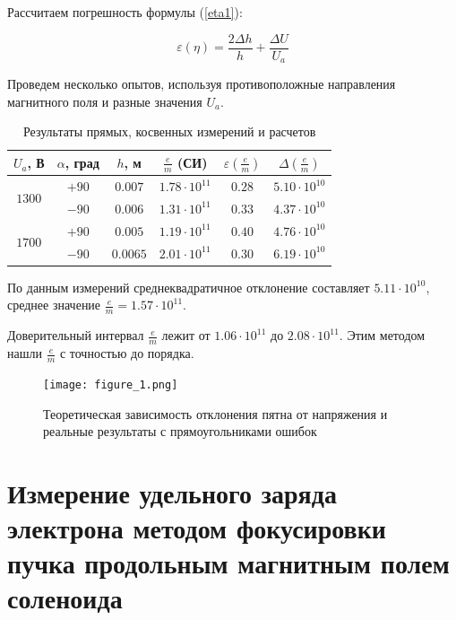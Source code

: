 Рассчитаем погрешность формулы (\ref{eta1}):

\begin{equation}
	\varepsilon{(\eta)}=\frac{2\Delta{h}}{h}+\frac{\Delta{U}}{U_a}
\end{equation}

Проведем несколько опытов, используя противоположные направления магнитного поля и разные значения $U_a$.

\begin{table}[h]
\begin{center}
\begin{tabular}{|c|c|c|c|c|c|}

\hline
$U_a$, В & $\alpha$, град & $h$, м & $\frac{e}{m}$ (СИ) & $\varepsilon{(\frac{e}{m})}$ & $\Delta{(\frac{e}{m})}$\\
\hline
\multirow{2}{*}{$1300$} & $+90$ & $0.007$ & $1.78\cdot10^{11}$ & $0.28$ & $5.10\cdot10^{10}$ \\ 

\cline{2-6}
						& $-90$ & $0.006$ & $1.31\cdot10^{11}$ & $0.33$ & $4.37\cdot10^{10}$ \\ \hline
\multirow{2}{*}{$1700$} & $+90$ & $0.005$ & $1.19\cdot10^{11}$ & $0.40$ & $4.76\cdot10^{10}$ \\
\cline{2-6}
						& $-90$ &$0.0065$ & $2.01\cdot10^{11}$ & $0.30$ & $6.19\cdot10^{10}$ \\ \hline

\end{tabular}
\end{center}
\caption{\label{tab:ex_1}Результаты прямых, косвенных измерений и расчетов}
\end{table} 

По данным измерений среднеквадратичное отклонение составляет $5.11\cdot10^{10}$, среднее значение $\frac{e}{m}=1.57\cdot10^{11}$.

Доверительный интервал $\frac{e}{m}$ лежит от $1.06\cdot10^{11}$ до $2.08\cdot10^{11}$. Этим методом нашли $\frac{e}{m}$ с точностью до порядка.

\begin{figure}[ht!]
	\centering
	\texttt{[image: figure\_1.png]}
	\caption{Теоретическая зависимость отклонения пятна от напряжения и реальные результаты с прямоугольниками ошибок}
	\label{fig:figure1}
\end{figure}


\section{Измерение удельного заряда электрона методом фокусировки пучка продольным магнитным полем соленоида}

